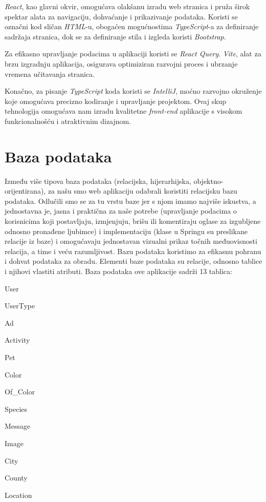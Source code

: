 \textit{React}, kao glavni okvir, omogućava olakšanu izradu web stranica i pruža širok spektar alata za navigaciju, dohvaćanje i prikazivanje podataka. Koristi se označni kod sličan \textit{HTML}-u, obogaćen mogućnostima \textit{TypeScript}-a za definiranje sadržaja stranica, dok se za definiranje stila i izgleda koristi \textit{Bootstrap}.

Za efikasno upravljanje podacima u aplikaciji koristi se \textit{React Query}. \textit{Vite}, alat za brzu izgradnju aplikacija, osigurava optimiziran razvojni proces i ubrzanje vremena učitavanja stranica.

Konačno, za pisanje \textit{TypeScript} koda koristi se \textit{IntelliJ}, moćno razvojno okruženje koje omogućava precizno kodiranje i upravljanje projektom. Ovaj skup tehnologija omogućava nam izradu kvalitetne \textit{front-end} aplikacije s visokom funkcionalnošću i atraktivnim dizajnom.\\
		
		
				
		\section{Baza podataka}
			
		Između više tipova baza podataka (relacijska, hijerarhijska, objektno-orijentirana), za našu smo web aplikaciju odabrali koristiti relacijsku bazu podataka. Odlučili smo se za tu vrstu baze jer s njom imamo najviše iskustva, a jednostavna je, jasna i praktična za naše potrebe (upravljanje podacima o korisnicima koji postavljaju, izmjenjuju, brišu ili komentiraju oglase za izgubljene odnosno pronađene ljubimce) i implementaciju (klase u Springu su preslikane relacije iz baze) i omogućavaju jednostavan vizualni prikaz točnih međuovisnosti relacija, a time i veću razumljivost. Bazu podataka koristimo za efikasnu pohranu i dohvat podataka za obradu. Elementi baze podataka su relacije, odnosno tablice i njihovi vlastiti atributi. Baza podataka ove aplikacije sadrži 13 tablica:
		
		\begin{packed_item}
			\item User
			\item UserType
			\item Ad
			\item Activity
			\item Pet
			\item Color
			\item Of\_Color
			\item Species
			\item Message
			\item Image
			\item City
			\item County
			\item Location
		\end{packed_item}

